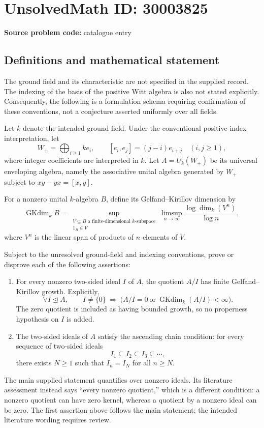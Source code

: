 \documentclass[11pt]{article}
\begin{document}
\section*{UnsolvedMath ID: 30003825}
\textbf{Source problem code:} catalogue entry
\subsection{Definitions and mathematical statement}
The ground field and its characteristic are not specified in the supplied record. The indexing of the basis of the positive Witt algebra is also not stated explicitly. Consequently, the following is a formulation schema requiring confirmation of these conventions, not a conjecture asserted uniformly over all fields.

Let \(k\) denote the intended ground field. Under the conventional positive-index interpretation, let
\[
W_+=\bigoplus_{i\geq 1}ke_i,
\qquad [e_i,e_j]=(j-i)e_{i+j}\quad(i,j\geq 1),
\]
where integer coefficients are interpreted in \(k\). Let \(A=U_k(W_+)\) be its universal enveloping algebra, namely the associative unital algebra generated by \(W_+\) subject to \(xy-yx=[x,y]\).

For a nonzero unital \(k\)-algebra \(B\), define its Gelfand--Kirillov dimension by
\[
\operatorname{GKdim}_k B
=\sup_{\substack{V\subseteq B\text{ a finite-dimensional }k\text{-subspace}\\1_B\in V}}
\limsup_{n\to\infty}\frac{\log\dim_k(V^n)}{\log n},
\]
where \(V^n\) is the linear span of products of \(n\) elements of \(V\).

Subject to the unresolved ground-field and indexing conventions, prove or disprove each of the following assertions:
\begin{enumerate}
\item For every nonzero two-sided ideal \(I\) of \(A\), the quotient \(A/I\) has finite Gelfand--Kirillov growth. Explicitly,
\[
\forall I\trianglelefteq A,\qquad
I\neq\{0\}\ \Longrightarrow\
\bigl(A/I=0\ \text{or}\ \operatorname{GKdim}_k(A/I)<\infty\bigr).
\]
The zero quotient is included as having bounded growth, so no properness hypothesis on \(I\) is added.
\item The two-sided ideals of \(A\) satisfy the ascending chain condition: for every sequence of two-sided ideals
\[
I_1\subseteq I_2\subseteq I_3\subseteq\cdots,
\]
there exists \(N\geq 1\) such that \(I_n=I_N\) for all \(n\geq N\).
\end{enumerate}
The main supplied statement quantifies over nonzero ideals. Its literature assessment instead says ``every nonzero quotient,'' which is a different condition: a nonzero quotient can have zero kernel, whereas a quotient by a nonzero ideal can be zero. The first assertion above follows the main statement; the intended literature wording requires review.
\end{document}
